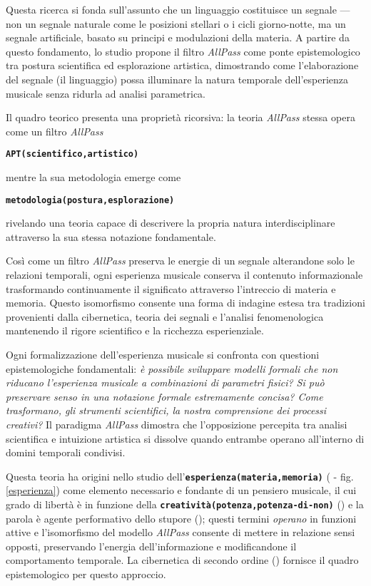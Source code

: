 \documentclass{../../lib/gs}
\newcommand{\apf}[3]{\textbf{\texttt{#1(#2,#3)}}}
\newcommand{\apfc}[3]{\begin{center}\apf{#1}{#2}{#3}\end{center}}
\begin{document}
Questa ricerca si fonda sull'assunto che un linguaggio costituisce un segnale — non un segnale naturale come le posizioni stellari o i cicli giorno-notte, ma un segnale artificiale, basato su principi e modulazioni della materia. A partire da questo fondamento, lo studio propone il filtro \emph{AllPass} come ponte epistemologico tra postura scientifica ed esplorazione artistica, dimostrando come l'elaborazione del segnale (il linguaggio) possa illuminare la natura temporale dell'esperienza musicale senza ridurla ad analisi parametrica.

Il quadro teorico presenta una proprietà ricorsiva: la teoria \emph{AllPass} stessa opera come un filtro \emph{AllPass}

\apfc{APT}{scientifico}{artistico}

\noindent mentre la sua metodologia emerge come

\apfc{metodologia}{postura}{esplorazione}

rivelando una teoria capace di descrivere la propria natura interdisciplinare attraverso la sua stessa notazione fondamentale.

Così come un filtro \emph{AllPass} preserva le energie di un segnale alterandone solo le relazioni temporali, ogni esperienza musicale conserva il contenuto informazionale trasformando continuamente il significato attraverso l'intreccio di materia e memoria. Questo isomorfismo consente una forma di indagine estesa tra tradizioni provenienti dalla cibernetica, teoria dei segnali e l'analisi fenomenologica mantenendo il rigore scientifico e la ricchezza esperienziale.

Ogni formalizzazione dell'esperienza musicale si confronta con questioni epistemologiche fondamentali: \textit{è possibile sviluppare modelli formali che non riducano l'esperienza musicale a combinazioni di parametri fisici? Si può preservare senso in una notazione formale estremamente concisa? Come trasformano, gli strumenti scientifici, la nostra comprensione dei processi creativi?} Il paradigma \emph{AllPass} dimostra che l'opposizione percepita tra analisi scientifica e intuizione artistica si dissolve quando entrambe operano all'interno di domini temporali condivisi.

Questa teoria ha origini nello studio dell'\apf{esperienza}{materia}{memoria} (\cite{bergson1896} - fig. \ref{esperienza}) come elemento necessario e fondante di un pensiero musicale, il cui grado di libertà è in funzione della \apf{creatività}{potenza}{potenza-di-non} (\cite{agamben2017}) e la parola è agente performativo dello stupore (\cite{ronchi2001}); questi termini \emph{operano} in funzioni attive e l'isomorfismo del modello \emph{AllPass} consente di mettere in relazione sensi opposti, preservando l'energia dell'informazione e modificandone il comportamento temporale. La cibernetica di secondo ordine (\cite{vonfoerster1981}) fornisce il quadro epistemologico per questo approccio.
\end{document}
